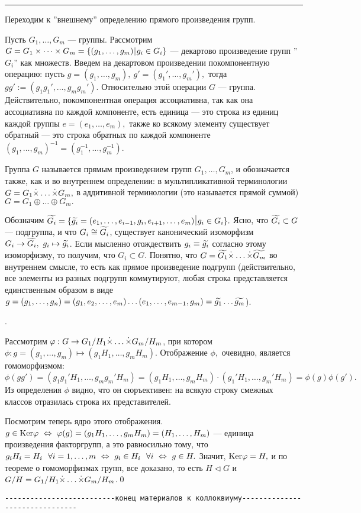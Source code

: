 \smallskip
\hrule \rule{0pt}{10pt}

Переходим к ''внешнему'' определению прямого произведения групп.

Пусть $G_1,\dots, G_m$ --- группы. Рассмотрим $G=G_1\times\dots\times G_m=\{(g_1,\dots,g_m)\,\vrule\,g_i\in G_i\}$ --- декартово произведение групп ''$ G_i$'' как множеств.
Введем на декартовом произведении покомпонентную операцию: пусть $g=(g_1,\dots,g_m),\ g'=(g_1',\dots,g_m'),$ тогда $gg':=(g_1g_1',\dots,g_mg_m').$
Относительно этой операции $G$ --- группа. Действительно, покомпонентная операция ассоциативна, так как она ассоциативна по каждой компоненте,
есть единица --- это строка из единиц каждой группы $e=(e_1,\dots,e_m),$ также ко всякому элементу существует обратный --- это строка обратных по каждой компоненте $(g_1,\dots,g_m)^{-1}=(g_1^{-1},\dots,g_m^{-1}).$

Группа $G$ называется прямым произведением групп $G_1,\dots,G_m$, и обозначается также, как и во внутреннем определении: в мультипликативной терминологии $G=G_1\dot{\times}\dots\dot{\times} G_m,$  в
аддитивной терминологии (это называется прямой суммой) $G=G_1\oplus\dots\oplus G_m.$

Обозначим
$\wt{G_i}=\{\wt{g_i}=(e_1,\dots,e_{i-1},g_i,e_{i+1},\dots,e_m)\,\vrule\,
g_i\in G_i\}.$ Ясно, что $\widetilde{G_i}\subset G$ --- подгруппа, и что
$G_i\cong \widetilde{G_i}$, существует канонический изоморфизм
$G_i\rightarrow \wt{G_i},\ g_i\mapsto \wt{g_i}$. Если мысленно
отождествить $g_i\equiv \widetilde{g_i}$ согласно этому изоморфизму, то
получим, что $G_i\subset G.$ Понятно, что
$G=\widetilde{G_1}\dot{\times}\dots\dot{\times}\widetilde{G_m}$ во внутреннем смысле, то есть как
прямое произведение подгрупп (действительно, все элементы из
разных подгрупп коммутируют, любая строка представляется
единственным образом в виде
$g=(g_1,\dots,g_n)=(g_1,e_2,\dots,e_m)\dots(e_1,\dots,e_{m-1},g_m)=\widetilde{g_1}\dots\widetilde{g_m}$).

.

\dok Рассмотрим $\varphi : G\rightarrow G_1/H_1\dot{\times}\dots\dot{\times} G_m/H_m$, при котором $\phi : g=(g_1,\dots,g_m)\mapsto (g_1H_1,\dots,g_mH_m).$
Отображение $\phi,$ очевидно, является гомоморфизмом: $$\phi(gg')=(g_1g_1'H_1,\dots,g_mg_m'H_m)=(g_1H_1,\dots,g_mH_m)\cdot(g_1'H_1,\dots,g_m'H_m)=\phi(g)\phi(g').$$
Из определения $\phi$ видно, что он сюръективен: на всякую строку смежных классов отразилась строка их представителей.

Посмотрим теперь ядро этого отображения. $g\in{\rm Ker}\varphi\ \Leftrightarrow\  \varphi(g)=(g_1H_1,\dots,g_mH_m)=(H_1,\dots,H_m)$ --- единица произведения факторгрупп, а это равносильно тому, что
$g_iH_i=H_i\ \ \forall i=1,\dots,m\lra g_i\in H_i\ \ \forall i\lra g\in H.$ Значит, ${\rm Ker}\varphi=H,$ и по теореме о гомоморфизмах групп, все доказано, то есть
$H\lhd G$ и $G/H=G_1/H_1\dot{\times}\dots\dot{\times} G_m/H_m$.\qquad\qed

\bigskip
\noindent\verb"--------------------------конец материалов к коллоквиуму-------------------------------"
